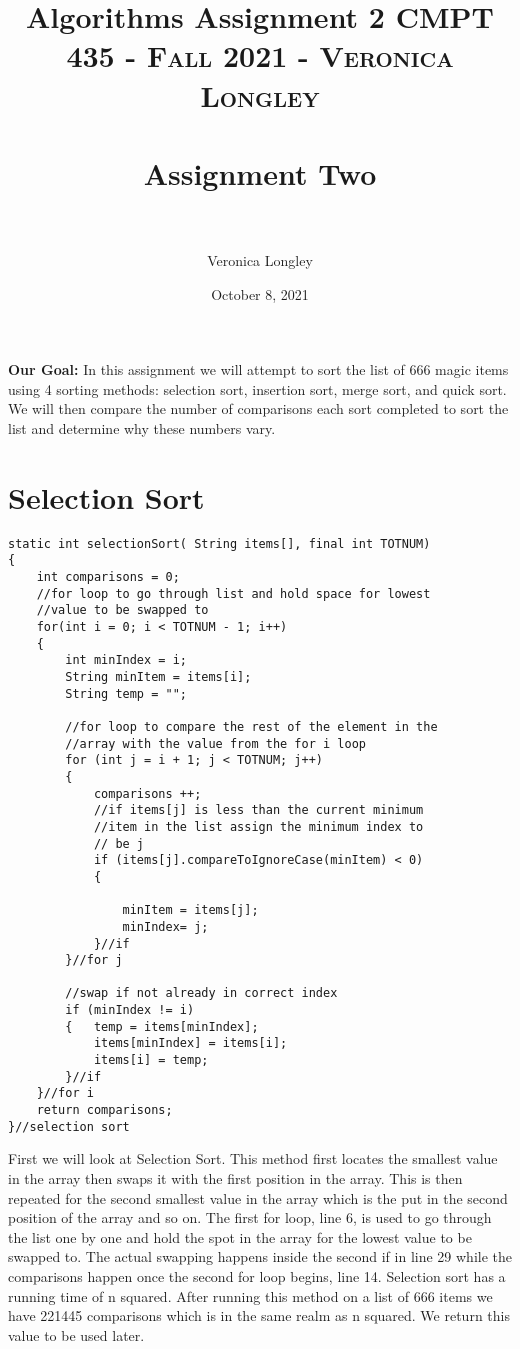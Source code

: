 \documentclass{article}
\title{\textbf{Algorithms Assignment 2}}
\author{Veronica Longley }
\date{October 8, 2021}
\title{	
   \normalfont \normalsize 
   \textsc{CMPT 435 - Fall 2021 - Veronica Longley} \\[10pt] %
   \horrule{0.5pt} \\[0.25cm] 	%
   \huge Assignment Two    	    \\ %
   \horrule{0.5pt} \\[0.25cm] 	%
}
\begin{document}
\lstset{numbers= left}
\lstset{language=Java}
\huge
\newcommand{\horrule}[1]{\rule{\linewidth}{#1}}

\maketitle{}


\pagebreak
\large
\textbf{Our Goal:}
In this assignment we will attempt to sort the list of 666 magic items using 4 sorting methods: selection sort, insertion sort, merge sort, and quick sort. We will then compare the number of comparisons each sort completed to sort the list and determine why these numbers vary. 

\small
\section{Selection Sort}
\begin{lstlisting}[frame =single,
backgroundcolor = \color{grey!12}]
static int selectionSort( String items[], final int TOTNUM)
{
	int comparisons = 0; 
	//for loop to go through list and hold space for lowest
	//value to be swapped to 
	for(int i = 0; i < TOTNUM - 1; i++)
	{
		int minIndex = i; 
		String minItem = items[i];
		String temp = "";
		
		//for loop to compare the rest of the element in the 
		//array with the value from the for i loop 
		for (int j = i + 1; j < TOTNUM; j++)
		{
			comparisons ++;
			//if items[j] is less than the current minimum
			//item in the list assign the minimum index to 
			// be j
			if (items[j].compareToIgnoreCase(minItem) < 0)
			{
				
				minItem = items[j];
				minIndex= j;
			}//if
		}//for j

		//swap if not already in correct index
		if (minIndex != i)
		{	temp = items[minIndex];
	        items[minIndex] = items[i];
	        items[i] = temp;
		}//if
	}//for i
	return comparisons;
}//selection sort
\end{lstlisting}
\large
First we will look at Selection Sort. This method first locates the smallest value in the array then swaps it with the first position in the array. This is then repeated for the second smallest value in the array which is the put in the second position of the array and so on. The first for loop, line 6, is used to go through the list one by one and hold the spot in the array for the lowest value to be swapped to. The actual swapping happens inside the second if in line 29 while the comparisons happen once the second for loop begins, line 14. Selection sort has a running time of n squared. After running this method on a list of 666 items we have 221445 comparisons which is in the same realm as n squared. We return this value to be used later. 
\end{document}
